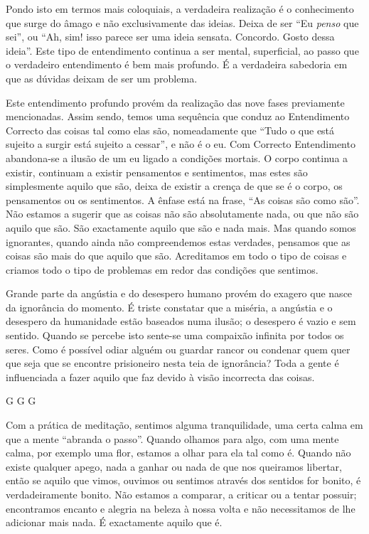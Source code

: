 Pondo isto em termos mais coloquiais, a verdadeira realização é o conhecimento
que surge do âmago e não exclusivamente das ideias. Deixa de ser “Eu
\emph{penso} que sei”, ou “Ah, sim! isso parece ser uma ideia sensata. Concordo.
Gosto dessa ideia”. Este tipo de entendimento continua a ser mental,
superficial, ao passo que o verdadeiro entendimento é bem mais profundo. É a
verdadeira sabedoria em que as dúvidas deixam de ser um problema.

Este entendimento profundo provém da realização das nove fases previamente
mencionadas. Assim sendo, temos uma sequência que conduz ao Entendimento
Correcto das coisas tal como elas são, nomeadamente que “Tudo o que está sujeito
a surgir está sujeito a cessar”, e não é o eu. Com Correcto Entendimento
abandona-se a ilusão de um eu ligado a condições mortais. O corpo continua a
existir, continuam a existir pensamentos e sentimentos, mas estes são
simplesmente aquilo que são, deixa de existir a crença de que se é o corpo, os
pensamentos ou os sentimentos. A ênfase está na frase, “As coisas são como são”.
Não estamos a sugerir que as coisas não são absolutamente nada, ou que não são
aquilo que são. São exactamente aquilo que são e nada mais. Mas quando somos
ignorantes, quando ainda não compreendemos estas verdades, pensamos que as
coisas são mais do que aquilo que são. Acreditamos em todo o tipo de coisas e
criamos todo o tipo de problemas em redor das condições que sentimos.

Grande parte da angústia e do desespero humano provém do exagero que nasce da
ignorância do momento. É triste constatar que a miséria, a angústia e o
desespero da humanidade estão baseados numa ilusão; o desespero é vazio e sem
sentido. Quando se percebe isto sente-se uma compaixão infinita por todos os
seres. Como é possível odiar alguém ou guardar rancor ou condenar quem quer que
seja que se encontre prisioneiro nesta teia de ignorância? Toda a gente é
influenciada a fazer aquilo que faz devido à visão incorrecta das coisas.

G G G

Com a prática de meditação, sentimos alguma tranquilidade, uma certa calma em
que a mente “abranda o passo”. Quando olhamos para algo, com uma mente calma,
por exemplo uma flor, estamos a olhar para ela tal como é. Quando não existe
qualquer apego, nada a ganhar ou nada de que nos queiramos libertar, então se
aquilo que vimos, ouvimos ou sentimos através dos sentidos for bonito, é
verdadeiramente bonito. Não estamos a comparar, a criticar ou a tentar possuir;
encontramos encanto e alegria na beleza à nossa volta e não necessitamos de lhe
adicionar mais nada. É exactamente aquilo que é.

